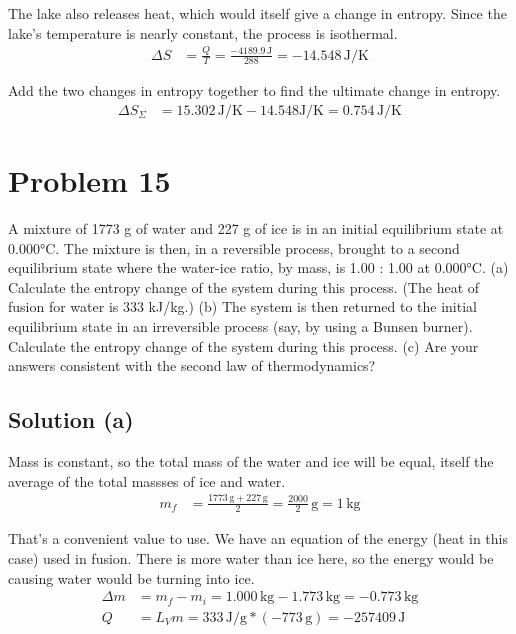 \documentclass[12pt]{article}
\begin{document}
            The lake also releases heat, which would itself give a change in entropy. 
            Since the lake's temperature is nearly constant, the process is isothermal.
            \begin{align}
                \Delta S    &=  \frac{Q}{T}
                    =   \frac{-4189.9\,\unit{\joule}}{288}
                    =   -14.548\,\unit{\joule/\kelvin}
            \end{align}

            Add the two changes in entropy together to find the ultimate change in entropy.
            \begin{align}
                \Delta S_{\Sigma}   &=  15.302\,\unit{\joule/\kelvin} - 14.548\unit{\joule/\kelvin}
                    =   \boxed{0.754\,\unit{\joule/\kelvin}}
            \end{align}

    \pagebreak
    \section{Problem 15}
        A mixture of 1773 g of water and 227 g of ice is in an initial equilibrium state at 0.000\unit{\celsius}. 
        The mixture is then, in a reversible process, brought to a second equilibrium state where the water-ice ratio, by mass, is 1.00 : 1.00 at 0.000\unit{\celsius}. 
        (a) Calculate the entropy change of the system during this process. 
        (The heat of fusion for water is 333 kJ/kg.) 
        (b) The system is then returned to the initial equilibrium state in an irreversible process (say, by using a Bunsen burner). 
        Calculate the entropy change of the system during this process. 
        (c) Are your answers consistent with the second law of thermodynamics?

        \subsection{Solution (a)}
            Mass is constant, so the total mass of the water and ice will be equal, itself the average of the total massses of ice and water.
            \begin{align}
                m_f &=  \frac{1773\,\unit{\gram} + 227\,\unit{\gram}}{2}
                    =   \frac{2000}{2}\,\unit{\gram}
                    =   1\,\unit{\kilo\gram}
            \end{align}

            That's a convenient value to use.
            We have an equation of the energy (heat in this case) used in fusion. 
            There is more water than ice here, so the energy would be causing water would be turning into ice.
            \begin{align}
                \Delta m    &=  m_f - m_i
                    =   1.000\,\unit{\kilo\gram} - 1.773\,\unit{\kilo\gram}
                    =   -0.773\,\unit{\kilo\gram}\\
                Q   &=  L_V m
                    =   333\,\unit{\joule/\gram} * (-773\,\unit{\gram})
                    =   -257409\,\unit{\joule}
            \end{align}
\end{document}

